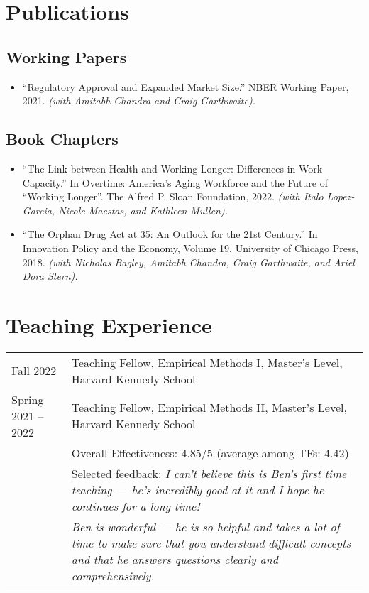 \documentclass[letterpaper]{article}
\begin{document}
\section*{Publications}
\subsection*{Working Papers}
\begin{itemize}
	\item ``Regulatory Approval and Expanded Market Size.'' NBER Working Paper, 2021. \textit{(with Amitabh Chandra and Craig Garthwaite).}
\end{itemize}

\subsection*{Book Chapters}
\begin{itemize}
	\item ``The Link between Health and Working Longer: Differences in Work Capacity.'' In Overtime: America's Aging Workforce and the Future of ``Working Longer''. The Alfred P. Sloan Foundation, 2022. \textit{(with Italo Lopez-Garcia, Nicole Maestas, and Kathleen Mullen).}
	
	\item ``The Orphan Drug Act at 35: An Outlook for the 21st Century.'' In Innovation Policy and the Economy, Volume 19. University of Chicago Press, 2018. \textit{(with Nicholas Bagley, Amitabh Chandra, Craig Garthwaite, and Ariel Dora Stern).}
\end{itemize}

\section*{Teaching Experience}
\begin{tabularx}{\linewidth}{@{}l X}
	Fall 2022 & Teaching Fellow, Empirical Methods I, Master's Level, Harvard Kennedy School \\
	Spring 2021 -- 2022 & Teaching Fellow, Empirical Methods II, Master's Level, Harvard Kennedy School \\
	& Overall Effectiveness: 4.85/5 (average among TFs: 4.42)\\
	& Selected feedback: \textit{I can't believe this is Ben's first time teaching --- he's incredibly good at it and I hope he continues for a long time!} \\
	& \textit{Ben is wonderful --- he is so helpful and takes a lot of time to make sure that you understand difficult concepts and that he answers questions clearly and comprehensively.}
\end{tabularx}
\end{document}
